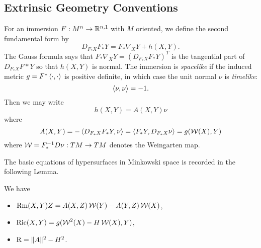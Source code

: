 \documentclass[a4paper, 12pt]{amsart}
\begin{document}
\subsection{Extrinsic Geometry Conventions}
\label{subsec:notation_extrinsic}

For an immersion \(F : M^n \to \mathbb{R}^{n,1}\) with \(M\) oriented, we define the second fundamental form by
\[
D_{F_{\ast} X} F_{\ast} Y = F_{\ast} \nabla_X Y + h(X, Y).
\]
The Gauss formula says that \(F_{\ast} \nabla_X Y = (D_{F_{\ast} X} F_{\ast} Y)^T\) is the tangential part of \(D_{F_{\ast} X} F{\ast} Y\) so that \(h(X, Y)\) is normal. The immersion is \emph{spacelike} if the induced metric \(g = F^{\ast} \left\langle \cdot,\cdot \right\rangle\) is positive definite, in which case the unit normal \(\nu\) is \emph{timelike}:
\[
\left\langle \nu,\nu \right\rangle = -1.
\]
Then we may write
\[
h(X, Y) = A(X, Y) \nu
\]
where
\[
A(X, Y) = -\left\langle D_{F_{\ast} X} F_{\ast} Y,\nu \right\rangle = \left\langle F_{\ast} Y,D_{F_{\ast} X} \nu \right\rangle = g(\operatorname{\mathcal{W}}(X), Y)
\]
where \(\operatorname{\mathcal{W}} = F_{\ast}^{-1} D\nu: TM \to TM\) denotes the Weingarten map.

The basic equations of hypersurfaces in Minkowski space is recorded in the following Lemma.

\begin{lemma}
We have
\begin{itemize}
\item \(\operatorname{Rm}(X, Y) Z = A(X, Z) \operatorname{\mathcal{W}}(Y) - A(Y, Z) \operatorname{\mathcal{W}}(X)\),
\item \(\operatorname{Ric}(X, Y) = g(\operatorname{\mathcal{W}}^2(X) - H \operatorname{\mathcal{W}}(X), Y)\),
\item \(\operatorname{R} = \|A\|^2 - H^2\).
\end{itemize}
\end{lemma}
\end{document}
